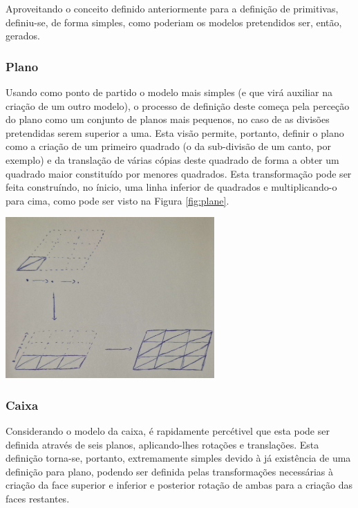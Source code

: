 Aproveitando o conceito definido anteriormente para a definição de
primitivas, definiu-se, de forma simples, como poderiam os modelos
pretendidos ser, então, gerados.

\subsubsection{Plano}

Usando como ponto de partido o modelo mais simples (e que virá auxiliar
na criação de um outro modelo), o processo de definição deste começa pela
perceção do plano como um conjunto de planos mais pequenos, no caso de
as divisões pretendidas serem superior a uma.\newline
\break
\noindent
Esta visão permite, portanto, definir o plano como a criação
de um primeiro quadrado (o da sub-divisão de um canto, por exemplo)
e da translação de várias cópias deste quadrado de forma a obter um
quadrado maior constituído por menores quadrados.\newline
\break
\noindent
Esta transformação pode ser feita construíndo, no ínicio, uma linha
inferior de quadrados e multiplicando-o para cima, como pode ser visto
na Figura \ref{fig:plane}.

\begin{center}
    \includegraphics[width=0.6\textwidth]{imgs/plane.png}
    \label{fig:plane}
\end{center}

\subsubsection{Caixa}

Considerando o modelo da caixa, é rapidamente percétivel que esta pode ser
definida através de seis planos, aplicando-lhes rotações e translações.\newline
\break
\noindent
Esta definição torna-se, portanto, extremamente simples devido à já
existência de uma definição para plano, podendo ser definida pelas
transformações necessárias à criação da face superior e inferior e
posterior rotação de ambas para a criação das faces restantes.

